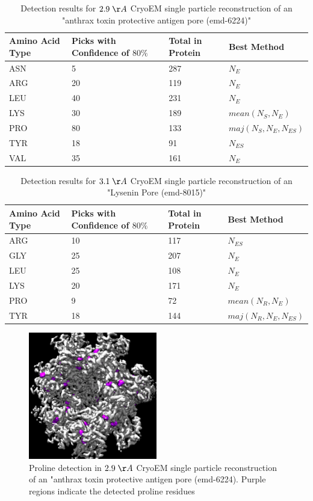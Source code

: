 \begin{table}
\begin{tabular}{ | m{4em} | m{1.5cm} || m{1.5cm}|| m{2.6cm}| } 
 \hline
 Amino Acid Type & Picks with Confidence of $80\%$  & Total in Protein & Best Method \\
 \hline
\hline
ASN  & 5    & 287 & $N_E$  \\
\hline
ARG  & 20    & 119 & $N_E$  \\
\hline
LEU  & 40    & 231 & $N_E$  \\
\hline
LYS  & 30    & 189 & $mean(N_S,N_E)$  \\
\hline
PRO  & 80  & 133 & $maj(N_S,N_E,N_{ES})$  \\
\hline
TYR  & 18    & 91 & $N_{ES}$  \\
\hline
VAL  & 35    & 161 & $N_E$  \\
\hline
\end{tabular}
\caption{Detection results for $2.9 \; \AA$ CryoEM single particle reconstruction of an "anthrax toxin protective antigen pore (emd-6224)"}\label{t29}
\end{table}

\begin{table}
\begin{tabular}{ | m{4em} | m{1.5cm} || m{1.5cm}|| m{2.6cm}| } 
 \hline
 Amino Acid Type & Picks with Confidence of $80\%$  & Total in Protein & Best Method \\
 \hline
\hline
ARG  & 10  & 117 & $N_{ES}$  \\
\hline
GLY  & 25  & 207 & $N_E$  \\
\hline
LEU  & 25  & 108 & $N_E$  \\
\hline
LYS  & 20  & 171 & $N_E$  \\
\hline
PRO  & 9  & 72 & $mean(N_R,N_E)$  \\
\hline
TYR  & 18  & 144 & $maj(N_R,N_E,N_{ES})$  \\
\hline

\end{tabular}
\caption{Detection results for $3.1 \; \AA$ CryoEM single particle reconstruction of an "Lysenin Pore (emd-8015)"}\label{t31}
\end{table}

\begin{figure}
  \caption{Proline detection in  $2.9 \; \AA$ CryoEM single particle reconstruction of an "anthrax toxin protective antigen pore (emd-6224). Purple regions indicate the detected proline residues} \label{f:PRO29}
  \centering
    \includegraphics[width=0.5\textwidth]{pics/map_PRO.png}
\end{figure}

